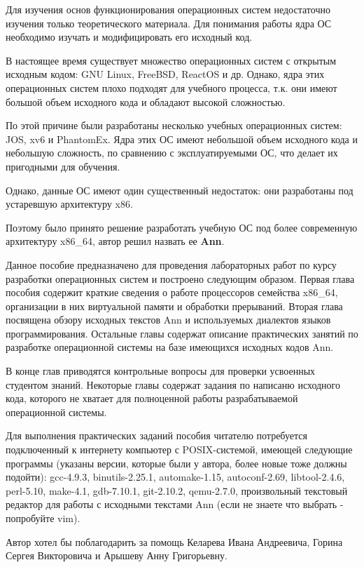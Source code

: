 \Introduction

Для изучения основ функционирования операционных систем недостаточно
изучения только теоретического материала. Для понимания работы ядра
ОС необходимо изучать и модифицировать его исходный код.

В настоящее время существует множество операционных систем с открытым
исходным кодом: GNU Linux, FreeBSD, ReactOS и др. Однако, ядра этих
операционных систем плохо подходят для учебного процесса, т.к. они
имеют большой объем исходного кода и обладают высокой сложностью.

По этой причине были разработаны несколько учебных операционных
систем: JOS, xv6 и PhantomEx. Ядра этих ОС имеют небольшой объем
исходного кода и небольшую сложность, по сравнению с
эксплуатируемыми ОС, что делает их пригодными для обучения.

Однако, данные ОС имеют один существенный недостаток: они разработаны
под устаревшую архитектуру x86.

Поэтому было принято решение разработать учебную ОС под более современную
архитектуру x86\_64, автор решил назвать ее \textbf{Ann}.

Данное пособие предназначено для проведения лабораторных работ по курсу
разработки операционных систем и построено следующим образом. Первая глава
пособия содержит краткие сведения о работе процессоров семейства x86\_64,
организации в них виртуальной памяти и обработки прерываний. Вторая глава
посвящена обзору исходных текстов Ann и используемых диалектов языков
программирования. Остальные главы содержат описание практических занятий по
разработке операционной системы на базе имеющихся исходных кодов Ann.

В конце глав приводятся контрольные вопросы для проверки усвоенных студентом
знаний. Некоторые главы содержат задания по написаню исходного кода, которого
не хватает для полноценной работы разрабатываемой операционной системы.

Для выполнения практических заданий пособия читателю потребуется подключенный
к интернету компьютер с POSIX-системой, имеющей следующие программы (указаны
версии, которые были у автора, более новые тоже должны подойти):
gcc-4.9.3, binutils-2.25.1, automake-1.15, autoconf-2.69, libtool-2.4.6,
perl-5.10, make-4.1, gdb-7.10.1, git-2.10.2, qemu-2.7.0,
произвольный текстовый редактор для работы с исходными текстами Ann (если не
знаете что выбрать - попробуйте vim).

Автор хотел бы поблагодарить за помощь Келарева Ивана Андреевича, Горина Сергея
Викторовича и Арышеву Анну Григорьевну.
